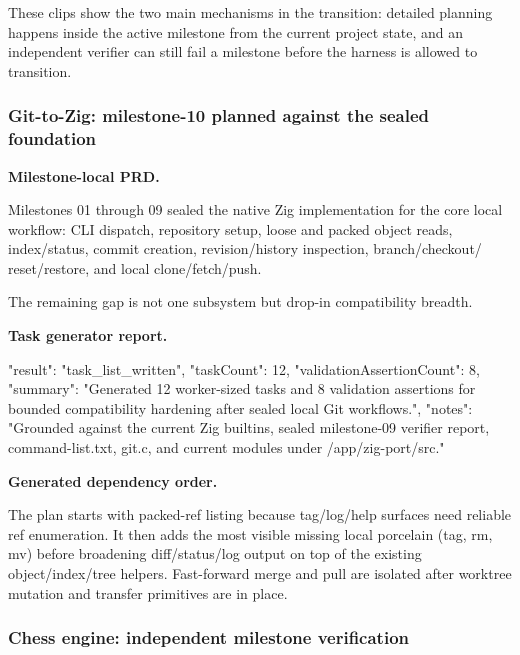 \documentclass[11pt,a4paper]{article}
\begin{document}
These clips show the two main mechanisms in the transition: detailed planning happens inside the active milestone from the current project state, and an independent verifier can still fail a milestone before the harness is allowed to transition.

\subsubsection{Git-to-Zig: milestone-10 planned against the sealed foundation}

\textbf{Milestone-local PRD.}

\begin{cbox}
Milestones 01 through 09 sealed the native Zig implementation for the core
local workflow: CLI dispatch, repository setup, loose and packed object reads,
index/status, commit creation, revision/history inspection, branch/checkout/
reset/restore, and local clone/fetch/push.

The remaining gap is not one subsystem but drop-in compatibility breadth.
\end{cbox}

\textbf{Task generator report.}

\begin{cbox}
{
  "result": "task_list_written",
  "taskCount": 12,
  "validationAssertionCount": 8,
  "summary": "Generated 12 worker-sized tasks and 8 validation assertions for bounded compatibility hardening after sealed local Git workflows.",
  "notes": "Grounded against the current Zig builtins, sealed milestone-09 verifier report, command-list.txt, git.c, and current modules under /app/zig-port/src."
}
\end{cbox}

\textbf{Generated dependency order.}

\begin{cbox}
The plan starts with packed-ref listing because tag/log/help surfaces need
reliable ref enumeration. It then adds the most visible missing local porcelain
(tag, rm, mv) before broadening diff/status/log output on top of the
existing object/index/tree helpers. Fast-forward merge and pull are isolated
after worktree mutation and transfer primitives are in place.
\end{cbox}

\subsubsection{Chess engine: independent milestone verification}
\end{document}
